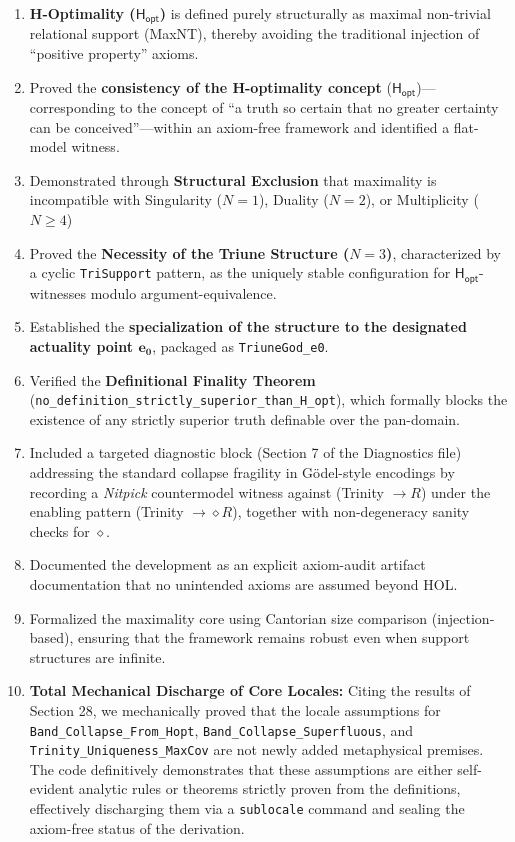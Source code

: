 \documentclass[a4paper, 11pt]{article}
\theoremstyle{plain}
\theoremstyle{definition}
\newcommand{\Hopt}{\mathsf{H_{opt}}}       %
\newcommand{\eZero}{\mathbf{e_0}}         %
\begin{document}
\begin{enumerate}
    \item \textbf{H-Optimality ($\Hopt$)} is defined purely structurally as maximal non-trivial relational support (\textsf{MaxNT}), thereby avoiding the traditional injection of ``positive property'' axioms.
    \item Proved the \textbf{consistency of the H-optimality concept} ($\Hopt$)---corresponding to the concept of ``a truth so certain that no greater certainty can be conceived''---within an axiom-free framework and identified a flat-model witness.
    \item Demonstrated through \textbf{Structural Exclusion} that maximality is incompatible with Singularity ($N=1$), Duality ($N=2$), or Multiplicity ($N \ge 4$)
    \item Proved the \textbf{Necessity of the Triune Structure ($N=3$)}, characterized by a cyclic \texttt{TriSupport} pattern, as the uniquely stable configuration for $\Hopt$-witnesses modulo argument-equivalence.
    \item Established the \textbf{specialization of the structure to the designated actuality point $\eZero$}, packaged as \texttt{TriuneGod\_e0}.
    \item Verified the \textbf{Definitional Finality Theorem} (\texttt{no\_definition\_strictly\_superior\_than\_H\_opt}), which formally blocks the existence of any strictly superior truth definable over the pan-domain.
    \item Included a targeted diagnostic block (Section 7 of the Diagnostics file) addressing the standard collapse fragility in Gödel-style encodings by recording a \textit{Nitpick} countermodel witness against (Trinity $\rightarrow R$) under the enabling pattern (Trinity $\rightarrow \diamond R$), together with non-degeneracy sanity checks for $\diamond$.
    \item Documented the development as an explicit axiom-audit artifact documentation that no unintended axioms are assumed beyond HOL.
    \item Formalized the maximality core using Cantorian size comparison (injection-based), ensuring that the framework remains robust even when support structures are infinite.
    \item \textbf{Total Mechanical Discharge of Core Locales:} Citing the results of Section 28, we mechanically proved that the locale assumptions for \texttt{Band\_Collapse\_From\_Hopt}, \texttt{Band\_Collapse\_Superfluous}, and \texttt{Trinity\_Uniqueness\_MaxCov} are not newly added metaphysical premises. The code definitively demonstrates that these assumptions are either self-evident analytic rules or theorems strictly proven from the definitions, effectively discharging them via a \texttt{sublocale} command and sealing the axiom-free status of the derivation.
\end{enumerate}
\end{document}
